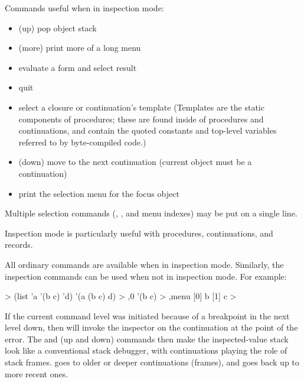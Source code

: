 %

Commands useful when in inspection mode:
\begin{itemize}
\item{} (up) pop object stack
\item{} (more) print more of a long menu
\item\code{(\ldots)} evaluate a form and select result
\item{} quit
\item{} select a closure or continuation's template
 (Templates are the static components of procedures; these are found
  inside of procedures and continuations, and contain the quoted
  constants and top-level variables referred to by byte-compiled code.)
\item{} (down) move to the next continuation
 (current object must be a continuation)
\item{} print the selection menu for the focus object
\end{itemize}

Multiple selection commands (, , and menu indexes)
 may be put on a single line.


Inspection mode is particularly useful with procedures, continuations,
and records.

All ordinary commands are available when in inspection mode.
Similarly, the inspection commands can be used when not in inspection
 mode.
For example:
\begin{example}
> (list 'a '(b c) 'd)
'(a (b c) d)
> ,0
'(b c)
> ,menu
[0] b
[1] c
> 
\end{example}

If the current command level was initiated because of
 a breakpoint in the next level down, then 
  will invoke the inspector on the
 continuation at the point of the error.
The  and  (up and down)
commands then make the inspected-value stack look like a conventional stack
debugger, with continuations playing the role of stack frames.   goes
to older or deeper continuations (frames), and  goes back up to more
recent ones.

